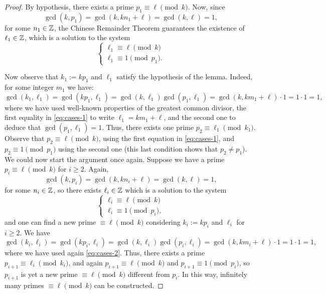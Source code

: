 \documentclass[../main.tex]{subfiles}
\begin{document}
\begin{proof}
	By hypothesis, there exists a prime $p_1\equiv \ell\pmod{k}$. Now, since 
	\begin{equation*}
	\gcd(k, p_1)=\gcd(k, kn_1+\ell)=\gcd(k,\ell)=1, 
	\end{equation*}
	for some $n_1\in\mathbb{Z}$, the Chinese Remainder Theorem guarantees the existence of $\ell_1\in\mathbb{Z}$, which is a solution to the system
	 	\begin{equation}\label{eq:cases-1}
	 	\begin{cases}      
	 		\ell_1\equiv \ell \pmod{k}\\
	 		\ell_1\equiv 1 \pmod{p_1}.
	 	\end{cases}
	 \end{equation}
	 
	 Now observe that $k_1:=kp_1$ and $\ell_1$ satisfy the hypothesis of the lemma. Indeed, for some integer $m_1$ we have:
	 \begin{equation*}
	 	\gcd(k_1,\ell_1)=\gcd(kp_1,\ell_1)=\gcd(k,\ell_1)\gcd(p_1,\ell_1)=\gcd(k,km_1+\ell)\cdot 1=1\cdot 1=1,
	 \end{equation*}
	 where we have used well-known properties of the greatest common divisor, the first equality in \cref{eq:cases-1} to write $\ell_1=km_1+\ell$, and the second one to deduce that $\gcd(p_1,\ell_1)=1$. Thus, there exists one prime $p_2\equiv\ell_1\pmod{k_1}$. Observe that $p_2\equiv\ell\pmod{k}$, using the first equation in \cref{eq:cases-1}, and $p_2\equiv 1\pmod{p_1}$ using the second one (this last condition shows that $p_2\neq p_1$). We could now start the argument once again. Suppose we have a prime $p_i\equiv\ell\pmod{k}$ for $i\geqslant 2$. Again, 
	 \begin{equation*}
	 	\gcd(k,p_i)=\gcd(k,kn_i+\ell)=\gcd(k,\ell)=1,
	 \end{equation*}
	 for some $n_i\in \mathbb{Z}$, so there exists $\ell_i\in \mathbb{Z}$ which is a solution to the system
	 	\begin{equation}\label{eq:cases-2}
	 	\begin{cases}      
	 		\ell_i\equiv \ell \pmod{k}\\
	 		\ell_i\equiv 1 \pmod{p_i},
	 	\end{cases}
	 \end{equation}
	and one can find a new prime $\equiv\ell\pmod{k}$ considering $k_i:=kp_i$ and $\ell_i$ for $i\geqslant 2$. We have
	 \begin{equation*}
	 	\gcd(k_i,\ell_i)=\gcd(kp_i,\ell_i)=\gcd(k,\ell_i)\gcd(p_i,\ell_i)=\gcd(k,km_i+\ell)\cdot 1=1\cdot 1=1,
	 \end{equation*}
	where we have used again \cref{eq:cases-2}. Thus, there exists a prime $p_{i+1}\equiv\ell_i\pmod{k_i}$, and again $p_{i+1}\equiv\ell\pmod{k}$ and $p_{i+1}\equiv1\pmod{p_i}$, so $p_{i+1}$ is yet a new prime $\equiv\ell\pmod{k}$ different from $p_i$. In this way, infinitely many primes $\equiv \ell \pmod{k}$ can be constructed.
\end{proof}
\end{document}
